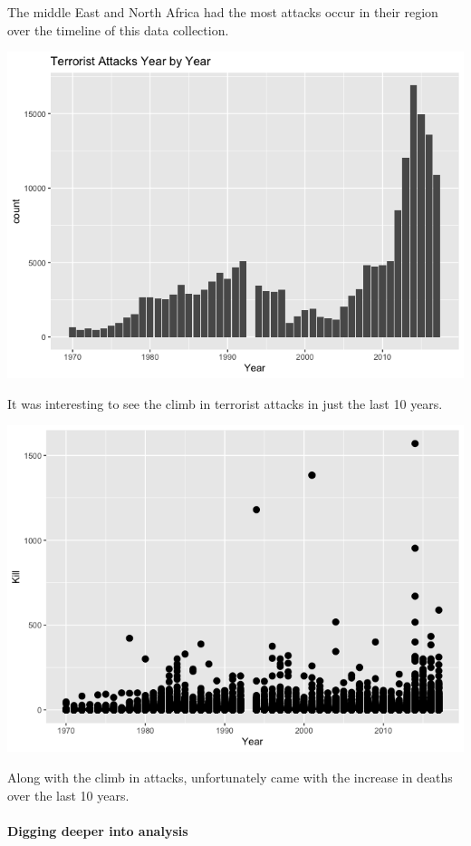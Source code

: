 \documentclass[
]{article}
\begin{document}
The middle East and North Africa had the most attacks occur in their
region over the timeline of this data collection.

\includegraphics{README_files/figure-gfm/unnamed-chunk-12-1.png}

It was interesting to see the climb in terrorist attacks in just the
last 10 years.

\includegraphics{README_files/figure-gfm/unnamed-chunk-13-1.png}

Along with the climb in attacks, unfortunately came with the increase in
deaths over the last 10 years.

\hypertarget{digging-deeper-into-analysis}{%
\paragraph{Digging deeper into
analysis}\label{digging-deeper-into-analysis}}
\end{document}
